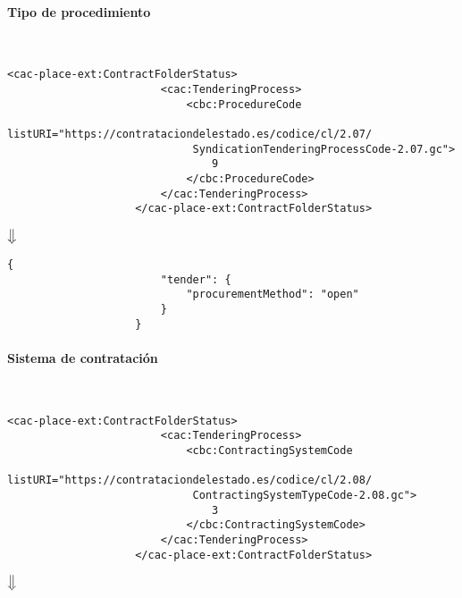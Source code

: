             \paragraph{Tipo de procedimiento} \mbox{}\\
                \begin{lstlisting}[language=lXML]
                    <cac-place-ext:ContractFolderStatus>
                        <cac:TenderingProcess>
                            <cbc:ProcedureCode
                             listURI="https://contrataciondelestado.es/codice/cl/2.07/
                             SyndicationTenderingProcessCode-2.07.gc">
                                9
                            </cbc:ProcedureCode>
                        </cac:TenderingProcess>
                    </cac-place-ext:ContractFolderStatus>
                \end{lstlisting}
                
                \begin{center}
                    $\big\Downarrow$
                \end{center}
                
                \begin{lstlisting}[language=lJSON]
                    {
                        "tender": {
                            "procurementMethod": "open"
                        }
                    }
                \end{lstlisting}
                
            \paragraph{Sistema de contratación} \mbox{}\\
                \begin{lstlisting}[language=lXML]
                    <cac-place-ext:ContractFolderStatus>
                        <cac:TenderingProcess>
                            <cbc:ContractingSystemCode
                             listURI="https://contrataciondelestado.es/codice/cl/2.08/
                             ContractingSystemTypeCode-2.08.gc">
                                3
                            </cbc:ContractingSystemCode>
                        </cac:TenderingProcess>
                    </cac-place-ext:ContractFolderStatus>
                \end{lstlisting}
                
                \begin{center}
                    $\big\Downarrow$
                \end{center}
                
